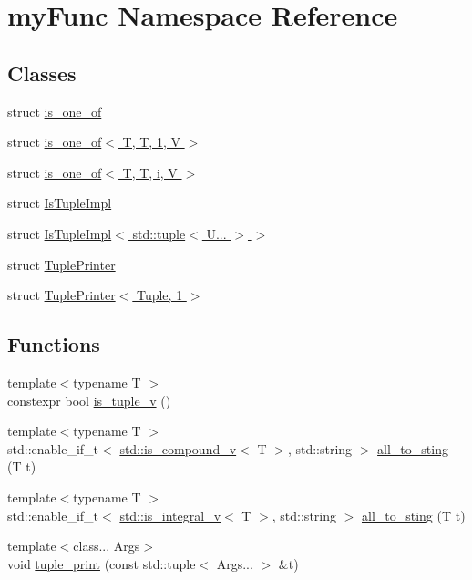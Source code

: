 \hypertarget{namespacemyFunc}{}\section{my\+Func Namespace Reference}
\label{namespacemyFunc}
\subsection*{Classes}
\begin{DoxyCompactItemize}
\item 
struct \hyperlink{structmyFunc_1_1is__one__of}{is\+\_\+one\+\_\+of}
\item 
struct \hyperlink{structmyFunc_1_1is__one__of_3_01T_00_01T_00_011_00_01V_01_4}{is\+\_\+one\+\_\+of$<$ T, T, 1, V $>$}
\item 
struct \hyperlink{structmyFunc_1_1is__one__of_3_01T_00_01T_00_01i_00_01V_01_4}{is\+\_\+one\+\_\+of$<$ T, T, i, V $>$}
\item 
struct \hyperlink{structmyFunc_1_1IsTupleImpl}{Is\+Tuple\+Impl}
\item 
struct \hyperlink{structmyFunc_1_1IsTupleImpl_3_01std_1_1tuple_3_01U_8_8_8_01_4_01_4}{Is\+Tuple\+Impl$<$ std\+::tuple$<$ U... $>$ $>$}
\item 
struct \hyperlink{structmyFunc_1_1TuplePrinter}{Tuple\+Printer}
\item 
struct \hyperlink{structmyFunc_1_1TuplePrinter_3_01Tuple_00_011_01_4}{Tuple\+Printer$<$ Tuple, 1 $>$}
\end{DoxyCompactItemize}
\subsection*{Functions}
\begin{DoxyCompactItemize}
\item 
{\footnotesize template$<$typename T $>$ }\\constexpr bool \hyperlink{namespacemyFunc_afe24a25839d94fd3368128576589722a}{is\+\_\+tuple\+\_\+v} ()
\item 
{\footnotesize template$<$typename T $>$ }\\std\+::enable\+\_\+if\+\_\+t$<$ \hyperlink{namespacestd_ae1e905cdb2694181466fae8f8dd8f8e8}{std\+::is\+\_\+compound\+\_\+v}$<$ T $>$, std\+::string $>$ \hyperlink{namespacemyFunc_a2880ec2f77273fe6723e3a9bf280f8f4}{all\+\_\+to\+\_\+sting} (T t)
\item 
{\footnotesize template$<$typename T $>$ }\\std\+::enable\+\_\+if\+\_\+t$<$ \hyperlink{namespacestd_a824c5eb1a7e8aafa382dc9af3329a9e8}{std\+::is\+\_\+integral\+\_\+v}$<$ T $>$, std\+::string $>$ \hyperlink{namespacemyFunc_a501f8e9903912dcbd57e865a214c6568}{all\+\_\+to\+\_\+sting} (T t)
\item 
{\footnotesize template$<$class... Args$>$ }\\void \hyperlink{namespacemyFunc_a6588b7e742bf09aefea7d531f5c8ca6e}{tuple\+\_\+print} (const std\+::tuple$<$ Args... $>$ \&t)
\end{DoxyCompactItemize}
